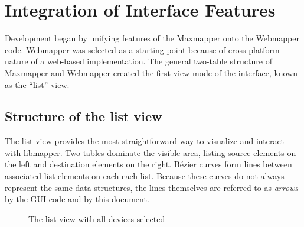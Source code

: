 
\section{Integration of Interface Features} %
\label{sec:integration_of_interface_features}

Development began by unifying features of the Maxmapper onto the Webmapper code. Webmapper was selected as a starting point because of cross-platform nature of a web-based implementation. The general two-table structure of Maxmapper and Webmapper created the first view mode of the interface, known as the ``list'' view.

	\subsection{Structure of the list view} %
	\label{sub:the_list_view}

The list view provides the most straightforward way to visualize and interact with libmapper. Two tables dominate the visible area, listing source elements on the left and destination elements on the right. B\'ezier curves form lines between associated list elements on each each list. Because these curves do not always represent the same data structures, the lines themselves are referred to as \emph{arrows} by the GUI code and by this document.

\begin{figure}[ht]
\centering
\caption{The list view with all devices selected}
\label{fig:list_view_all_devices}
\end{figure}

